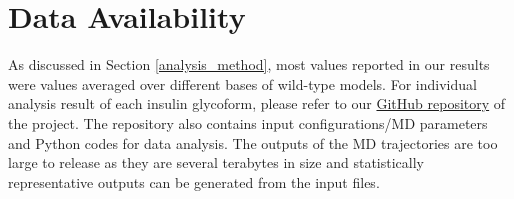 \documentclass[9pt]{elife}
\begin{document}


\section{Data Availability}
As discussed in Section \ref{analysis_method}, most values reported in our results were values averaged over different bases of wild-type models. For individual analysis result of each insulin glycoform, please refer to our \href{https://github.com/shirtsgroup/Glycoinsulin_project}{GitHub repository} of the project. The repository also contains input configurations/MD parameters and Python codes for data analysis. The outputs of the MD trajectories are too large to release as they are several terabytes in size and statistically representative outputs can be generated from the input files.   
\end{document}
